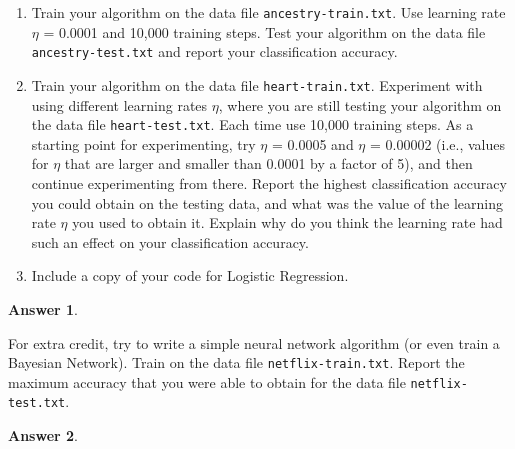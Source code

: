\documentclass[12pt]{article}
\renewcommand{\(}{\left(}
\renewcommand{\)}{\right)}
\theoremstyle{definition}
\newtheorem*{answer}{Answer}
\begin{document}
\begin{enumerate}
{{\begin{enumerate}
        \item Train your algorithm on the data file \texttt{ancestry-train.txt}. Use learning rate $\eta$ = 0.0001 and 10,000 training steps. Test your algorithm on the data file \texttt{ancestry-test.txt} and report your classification accuracy.
        \item Train your algorithm on the data file \texttt{heart-train.txt}. Experiment with using different learning rates $\eta$, where you are still testing your algorithm on the data file \texttt{heart-test.txt}. Each time use 10,000 training steps. As a starting point for experimenting, try $\eta$ = 0.0005 and $\eta$ = 0.00002 (i.e., values for $\eta$ that are larger and smaller than 0.0001 by a factor of 5), and then continue experimenting from there. Report the highest classification accuracy you could obtain on the testing data, and what was the value of the learning rate $\eta$ you used to obtain it. Explain why do you think the learning rate had such an effect on your classification accuracy.
        \item Include a copy of your code for Logistic Regression.
    \end{enumerate}
    
    \begin{shaded}
    \begin{answer}
    
    \end{answer}
    \end{shaded}
    \newpage
    
    \item {} For extra credit, try to write a simple neural network algorithm (or even train a Bayesian Network). Train on the data file \texttt{netflix-train.txt}. Report the maximum accuracy that you were able to obtain for the data file \texttt{netflix-test.txt}.
    
    \begin{shaded}
    \begin{answer}
    
    \end{answer}
    \end{shaded}
    
}}
\end{enumerate}
\end{document}
